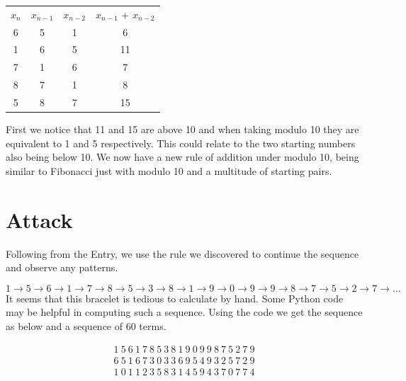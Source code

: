 \documentclass[11pt]{article}
\newcommand{\keywordfont}{\textsc}
\newcommand{\keyword}[1]{%
  \marginpar{\raggedright\small\keywordfont{#1}}}
\begin{document}
\begin{table} [h]
    \centering
    \begin{tabular}{c|c|c|c}
         $x_n$ & $x_{n-1}$ & $x_{n-2}$ & $x_{n-1}$ + $x_{n-2}$ \\
         6 & 5 & 1 & 6 \\
         1 & 6 & 5 & 11 \\
         7 & 1 & 6 & 7 \\
         8 & 7 & 1 & 8 \\
         5 & 8 & 7 & 15 \\
    \end{tabular}
\end{table}

First we notice that \keyword{AHA} 11 and 15 are above 10 and when taking modulo 10 they are equivalent to 1 and 5 respectively. This could relate to the two starting numbers also being below 10. We now have a new rule of addition under modulo 10, being similar to Fibonacci just with modulo 10 and a multitude of starting pairs.






\section{Attack}
Following from the Entry, we use the rule we discovered \keyword{Try} to continue the sequence and observe any patterns.

\[
1 \rightarrow 5 \rightarrow 6 \rightarrow 1 \rightarrow 7 \rightarrow 8 \rightarrow 5 \rightarrow 3 \rightarrow 8 \rightarrow 1 \rightarrow 9 \rightarrow 0 \rightarrow 9 \rightarrow 9 \rightarrow 8 \rightarrow 7 \rightarrow 5 \rightarrow 2 \rightarrow 7 \rightarrow  ...
\]
It seems that this bracelet is \keyword{Stuck} tedious to calculate by hand. Some Python code may be helpful in computing such a sequence. \keyword{AHA} Using the code we get the sequence as below and a sequence of 60 terms. 

\begin{align*}
1 \ 5 \ 6 \ 1 \ 7 \ 8 \ 5 \ 3 \ 8 \ 1 \ 9 \ 0 \ 9 \ 9 \ 8 \ 7 \ 5 \ 2 \ 7 \ 9 \\
6 \ 5 \ 1 \ 6 \ 7 \ 3 \ 0 \ 3 \ 3 \ 6 \ 9 \ 5 \ 4 \ 9 \ 3 \ 2 \ 5 \ 7 \ 2 \ 9 \\
1 \ 0 \ 1 \ 1 \ 2 \ 3 \ 5 \ 8 \ 3 \ 1 \ 4 \ 5 \ 9 \ 4 \ 3 \ 7 \ 0 \ 7 \ 7 \ 4   
\end{align*}
\end{document}
